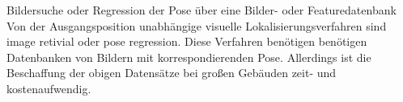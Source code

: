 Bildersuche oder Regression der Pose über eine Bilder- oder Featuredatenbank 
Von der Ausgangsposition unabhängige visuelle Lokalisierungsverfahren 
sind image retivial oder pose regression. Diese Verfahren benötigen benötigen Datenbanken von Bildern mit korrespondierenden Pose. Allerdings ist die Beschaffung der obigen Datensätze bei großen Gebäuden zeit- und kostenaufwendig.
%
%


